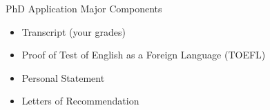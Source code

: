 \begin{frame}[fragile]{PhD Application Major Components}
    \begin{itemize}
        \item Transcript (your grades)
        \item Proof of Test of English as a Foreign Language (TOEFL)
        \item Personal Statement
        \item Letters of Recommendation
    \end{itemize}
\end{frame}

